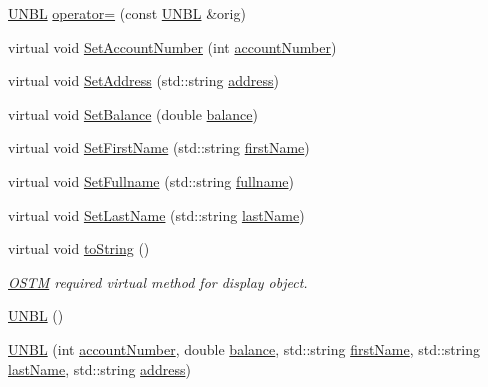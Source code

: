 \begin{DoxyCompactItemize}
\hyperlink{class_u_n_b_l}{U\+N\+BL} \hyperlink{class_u_n_b_l_a32ab1105494f18bdb33e651e9bbfcd02_a32ab1105494f18bdb33e651e9bbfcd02}{operator=} (const \hyperlink{class_u_n_b_l}{U\+N\+BL} \&orig)
\item 
virtual void \hyperlink{class_u_n_b_l_a0ee536d872c0f93486f942b268c2431e_a0ee536d872c0f93486f942b268c2431e}{Set\+Account\+Number} (int \hyperlink{class_u_n_b_l_a90763c3044159862bcb9cd51d6b09f34_a90763c3044159862bcb9cd51d6b09f34}{account\+Number})
\item 
virtual void \hyperlink{class_u_n_b_l_acbd63767c5070d82605671cfce0433a9_acbd63767c5070d82605671cfce0433a9}{Set\+Address} (std\+::string \hyperlink{class_u_n_b_l_acdaf39211e9b9c190a69bbbc590543e3_acdaf39211e9b9c190a69bbbc590543e3}{address})
\item 
virtual void \hyperlink{class_u_n_b_l_a3b7b2089cf4e2995e99b860b1fb2e5cb_a3b7b2089cf4e2995e99b860b1fb2e5cb}{Set\+Balance} (double \hyperlink{class_u_n_b_l_afbe674996d7fddaffb55654e6a79f03b_afbe674996d7fddaffb55654e6a79f03b}{balance})
\item 
virtual void \hyperlink{class_u_n_b_l_aef061d2cba01bcd752e9305dc374cabc_aef061d2cba01bcd752e9305dc374cabc}{Set\+First\+Name} (std\+::string \hyperlink{class_u_n_b_l_acee1595bf1914ac220f7c810b174bd16_acee1595bf1914ac220f7c810b174bd16}{first\+Name})
\item 
virtual void \hyperlink{class_u_n_b_l_a1b3f52c44756930c1ee4acb06f2634ad_a1b3f52c44756930c1ee4acb06f2634ad}{Set\+Fullname} (std\+::string \hyperlink{class_u_n_b_l_a67deb62f553fe1ece6feb73f12898e7a_a67deb62f553fe1ece6feb73f12898e7a}{fullname})
\item 
virtual void \hyperlink{class_u_n_b_l_abd683db339dffe71af3993a8a5cb5929_abd683db339dffe71af3993a8a5cb5929}{Set\+Last\+Name} (std\+::string \hyperlink{class_u_n_b_l_a3f42790177cbe310536f53a7369ee194_a3f42790177cbe310536f53a7369ee194}{last\+Name})
\item 
virtual void \hyperlink{class_u_n_b_l_a76d8bba21d64d79d8de63763b8acc1fd_a76d8bba21d64d79d8de63763b8acc1fd}{to\+String} ()
\begin{DoxyCompactList}\small\item\em \hyperlink{class_o_s_t_m}{O\+S\+TM} required virtual method for display object. \end{DoxyCompactList}\item 
\hyperlink{class_u_n_b_l_aa264ef64c453e6049b3d4c984d84d1de_aa264ef64c453e6049b3d4c984d84d1de}{U\+N\+BL} ()
\item 
\hyperlink{class_u_n_b_l_a9afc7728e8d9970b63592af018a2afb8_a9afc7728e8d9970b63592af018a2afb8}{U\+N\+BL} (int \hyperlink{class_u_n_b_l_a90763c3044159862bcb9cd51d6b09f34_a90763c3044159862bcb9cd51d6b09f34}{account\+Number}, double \hyperlink{class_u_n_b_l_afbe674996d7fddaffb55654e6a79f03b_afbe674996d7fddaffb55654e6a79f03b}{balance}, std\+::string \hyperlink{class_u_n_b_l_acee1595bf1914ac220f7c810b174bd16_acee1595bf1914ac220f7c810b174bd16}{first\+Name}, std\+::string \hyperlink{class_u_n_b_l_a3f42790177cbe310536f53a7369ee194_a3f42790177cbe310536f53a7369ee194}{last\+Name}, std\+::string \hyperlink{class_u_n_b_l_acdaf39211e9b9c190a69bbbc590543e3_acdaf39211e9b9c190a69bbbc590543e3}{address})

\end{DoxyCompactItemize}
